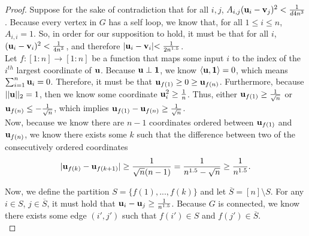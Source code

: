 \documentclass[psamsfonts, 10pt]{amsart}
\theoremstyle{definition}
\theoremstyle{remark}
\numberwithin{equation}{section}
\begin{document}
\begin{proof}
Suppose for the sake of contradiction that for all $i,j$, $A_{i,j}({\bf u}_i - {\bf v}_j)^2 < \frac{1}{d4n^3}$. Because every vertex in $G$ has a self loop, we know that, for all $1 \leq i \leq n$, $A_{i,i} = 1$. So, in order for our supposition to hold, it must be that for all $i$,
$({\bf u}_i - {\bf v}_i)^2 < \frac{1}{4n^3}$, and therefore $\lvert {\bf u}_i - {\bf v}_i \lvert < \frac{1}{2n^{1.5}}$.\\

Let $f: [1:n] \to [1:n]$ be a function that maps some input $i$ to the index of the $i^{th}$ largest coordinate of ${\bf u}$. Because $\bf{u} \perp {\bf 1}$, we know $\langle {\bf u}, {\bf 1}\rangle = 0$, which means $\sum_{i=1}^n {\bf u}_i = 0$. Therefore, it must be that ${\bf u}_{f(1)} \geq 0 \geq {\bf u}_{f(n)}$. Furthermore, because $\lvert \lvert {\bf u} \rvert \rvert_2 = 1$, then we know some coordinate ${\bf u}_i^2 \geq \frac{1}{n}$. Thus, either ${\bf u}_{f(1)} \geq \frac{1}{\sqrt{n}}$ or ${\bf u}_{f(n)} \leq -\frac{1}{\sqrt{n}}$, which implies ${\bf u}_{f(1)}- {\bf u}_{f(n)} \geq \frac{1}{\sqrt{n}}$.\\

Now, because we know there are $n-1$ coordinates ordered between ${\bf u}_{f(1)}$ and ${\bf u}_{f(n)}$, we know there exists some $k$ such that  the difference between two of the consecutively ordered coordinates \[
\lvert {\bf u}_{f(k)} - {\bf u}_{f(k+1)} \rvert \geq\frac{1}{\sqrt{n}(n-1)} = \frac{1}{n^{1.5} - \sqrt{n}} \geq \frac{1}{n^{1.5}}.
\]

Now, we define the partition $S =\{f(1), ..., f(k)\}$ and let $\overline{S} = [n] \setminus S$. For any $i \in S$, $j \in \overline{S}$, it must hold that ${\bf u}_{i} - {\bf u}_{j} \geq \frac{1}{n^{1.5}}$. Because $G$ is connected, we know there exists some edge $(i', j')$ such that $f(i') \in S$ and $f(j') \in \overline{S}$.\\


\end{proof}
\end{document}
